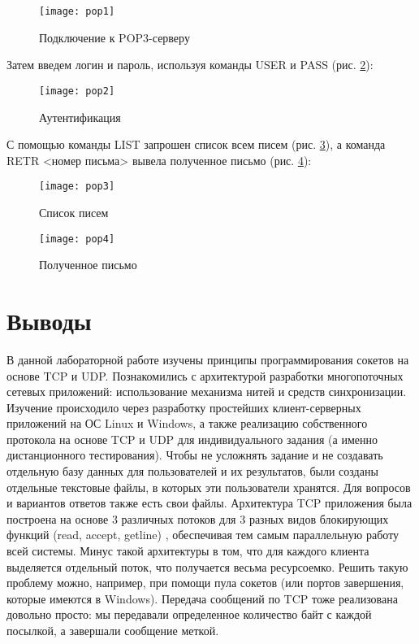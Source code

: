 \begin{figure}[H]
	\begin{center}
		\texttt{[image: pop1]}
		\caption{Подключение к POP3-серверу} 
		\label{pic:pop1} %
	\end{center}
\end{figure}

Затем введем логин и пароль, используя команды USER и PASS  (рис. \ref{pic:pop2}):

\begin{figure}[H]
	\begin{center}
		\texttt{[image: pop2]}
		\caption{Аутентификация} 
		\label{pic:pop2} %
	\end{center}
\end{figure}

С помощью команды LIST запрошен список всем писем  (рис. \ref{pic:pop3}), а команда RETR <номер письма> вывела полученное письмо (рис. \ref{pic:pop4}):

\begin{figure}[H]
	\begin{center}
		\texttt{[image: pop3]}
		\caption{Список писем} 
		\label{pic:pop3} %
	\end{center}
\end{figure}

\begin{figure}[H]
	\begin{center}
		\texttt{[image: pop4]}
		\caption{Полученное письмо} 
		\label{pic:pop4} %
	\end{center}
\end{figure}


\section{Выводы}
В данной лабораторной работе изучены принципы программирования сокетов на основе TCP и UDP. Познакомились с архитектурой разработки многопоточных сетевых приложений: использование механизма нитей и средств синхронизации. Изучение происходило через разработку простейших клиент-серверных приложений на ОС Linux и Windows, а также реализацию собственного протокола на основе TCP и UDP для индивидуального задания (а именно дистанционного тестирования). 
Чтобы не усложнять задание и не создавать отдельную базу данных для пользователей и их результатов, были созданы отдельные текстовые файлы, в которых эти пользователи хранятся. Для вопросов и вариантов ответов также есть свои файлы.
Архитектура TCP приложения была построена на основе 3 различных потоков для 3 разных видов блокирующих функций (read, accept, getline) , обеспечивая тем самым параллельную работу всей системы. Минус такой архитектуры в том, что для каждого клиента выделяется отдельный поток, что получается весьма ресурсоемко. Решить такую проблему можно, например, при помощи пула сокетов (или портов завершения, которые имеются в Windows).  
Передача сообщений по TCP тоже реализована довольно просто: мы передавали определенное количество байт с каждой посылкой, а завершали сообщение меткой.

